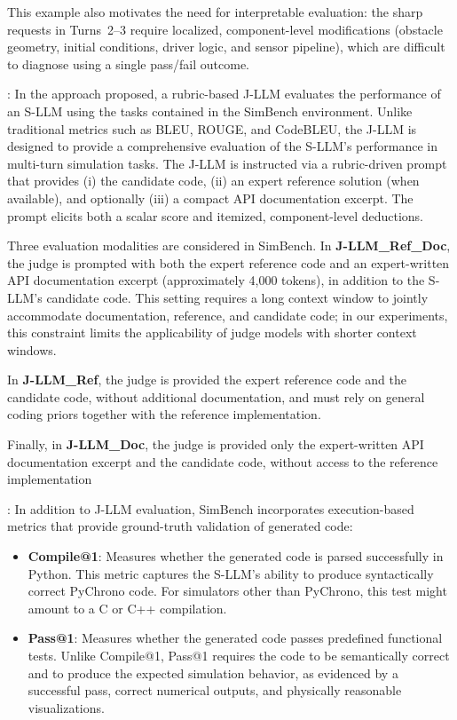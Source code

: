     
\noindent This example also motivates the need for interpretable evaluation: the sharp requests in Turns~2--3 require localized, component-level modifications (obstacle geometry, initial conditions, driver logic, and sensor pipeline), which are difficult to diagnose using a single pass/fail outcome.

\medskip

{:}
\label{sec:modalities} In the approach proposed, a rubric-based J-LLM evaluates the performance of an S-LLM using the tasks contained in the SimBench environment. Unlike traditional metrics such as BLEU, ROUGE, and CodeBLEU, the J-LLM is designed to provide a comprehensive evaluation of the S-LLM's performance in multi-turn simulation tasks. The J-LLM is instructed via a rubric-driven prompt that provides (i) the candidate code, 
(ii) an expert reference solution (when available), and optionally (iii) a compact API documentation excerpt.
The prompt elicits both a scalar score and itemized, component-level deductions.

Three evaluation modalities are considered in SimBench.
In \textbf{J-LLM\_Ref\_Doc}, the judge is prompted with both the expert reference code and an expert-written API documentation excerpt (approximately 4{,}000 tokens), in addition to the S-LLM’s candidate code.
This setting requires a long context window to jointly accommodate documentation, reference, and candidate code; in our experiments, this constraint limits the applicability of judge models with shorter context windows.

In \textbf{J-LLM\_Ref}, the judge is provided the expert reference code and the candidate code, without additional documentation, and must rely on general coding priors together with the reference implementation.

Finally, in \textbf{J-LLM\_Doc}, the judge is provided only the expert-written API documentation excerpt and the candidate code, without access to the reference implementation

\medskip

{}: In addition to J-LLM evaluation, SimBench incorporates execution-based metrics that provide ground-truth validation of generated code:

\begin{itemize}
    \item \textbf{Compile@1}: Measures whether the generated code is parsed successfully in Python. This metric captures the S-LLM's ability to produce syntactically correct PyChrono code. For simulators other than PyChrono, this test might amount to a C or C++ compilation.
    \item \textbf{Pass@1}: Measures whether the generated code passes predefined functional tests. Unlike Compile@1, Pass@1 requires the code to be semantically correct and to produce the expected simulation behavior, as evidenced by a successful pass, correct numerical outputs, and physically reasonable visualizations.
\end{itemize}


